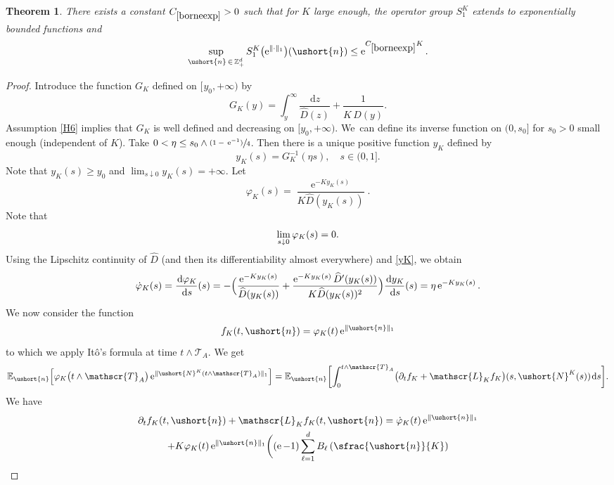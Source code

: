 \documentclass[JEP,XML,SOM,Unicode]{cedram}
\newcommand{\psfrac}[2]{\sfrac{(#1)}{#2}}
\let\mathcal\mathscr
\numberwithin{equation}{section}
\theoremstyle{plain}
\newtheorem{theorem}{Theorem}[section]
\theoremstyle{definition}
\newcommand{\cte}[1]{C_{\eqref{#1}}}
\newcommand{\E}{{\mathbb{E}}}
\newcommand{\zentiers}{{\mathbb{Z}}}
\newcommand{\sdomaine}{{\zentiers}_+^d}
\newcommand{\sK}{K}
\newcommand{\gen}{\mathscr{L}_{\sK}}
\newcommand{\vecn}{\ushort{n}}
\newcommand{\leproc}{\ushort{N}^{K}}
\newcommand{\sleproc}{\ushort{N}^{K}}
\newcommand{\e}{\operatorname{e}}
\newcommand{\dd}{\hspace{1pt}\mathrm{d}}
\begin{document}
\begin{theorem}\label{borneexp}
There exists a constant $\cte{borneexp}>0$ such that for $K$ large enough, the operator
group $S^{\sK}_{1}$ extends to exponentially bounded functions and
\[
\sup_{\vecn\, \in\, \sdomaine} S^{\sK}_{1}\bigl(\e^{\|\hspace{-0.1pt}\cdot\|_{1}}\bigr)(\vecn)\le
\e^{\cte{borneexp} K}.
\]
\end{theorem}
\begin{proof}
Introduce the function $G_{\sK}$ defined on $[\hspace{1pt}y_{0},+\infty)$ by
\[
G_{\!\sK}(y) = \int_{y}^{\infty}\frac{\dd z}{\widehat{D}(z)}+\frac{1}{K\,\widehat{D}(y)}.
\]
Assumption \eqref{H6} implies that $G_{\!\sK}$ is well defined and decreasing on $[y_{0},+\infty)$. We~can define its
inverse function on $(0,s_{0}]$ for $s_{0}>0$ small enough (independent of $K$).
Take $0<\eta \leq s_{0}\wedge \psfrac{1-\,\e^{-1}}{4}$. Then there is a unique positive function $y_{\sK}$ defined by
\begin{equation}
\label{yK}
y_{\sK}(s)=G_{\!\sK}^{-1}(\eta s),\quad s\in(0,1].
\end{equation}
Note that $y_{\sK}(s)\geq y_{0}$ and $\lim_{s\downarrow 0}y_{\sK}(s)=+\infty$.
Let
\[
\varphi_{\sK}(s)=\frac{\e^{-K y_{K}(s)}}{K \widehat{D}(y_{\sK}(s))}.
\]
Note that
\[
\lim_{s\hspace{.2pt}\downarrow\hspace{.2pt}0}\varphi_{\sK}(s)=0.
\]
Using the Lipschitz continuity of $\widehat{D}$ (and then its differentiability almost everywhere) and \eqref{yK}, we obtain
\[
\dot{\varphi}_{\sK}(s)=\frac{\dd\varphi_{\sK}}{\dd s}(s)=
-\Bigl(\frac{\e^{-K y_{K}(s)}}{\widehat{D}(y_{\sK}(s))}+
\frac{\e^{-K y_{K}(s)} \widehat{D}'(y_{\sK}(s))}{K \widehat{D}(y_{\sK}(s))^{2}}\Bigr)\frac{\dd y_{\sK}}{\dd s}(s)
= \eta \e^{-K y_{K}(s)}.
\]
We now consider the function
\[
f_{\sK}(t,\vecn)=\varphi_{\sK}(t)\e^{\|\vecn\|_{1}}
\]
to which we apply Itô's formula at time $t\wedge \mathcal{T}_A$. We get
\[
\E_{\vecn}\Bigl[\varphi_{\sK}\bigl(t\wedge \mathcal{T}_A\bigr)\e^{\|\sleproc(t\wedge \mathcal{T}_A)\|_{1}}\Bigr]=
\E_{\vecn} \biggl[\int_{0}^{t\wedge \mathcal{T}_A}\bigl(\partial_{t}f_{\sK}+\gen f_{\sK}\bigr)(s,\leproc(s))\dd s \biggr].
\]
We have
\begin{multline*}
\partial_{t}f_{\sK}(t,\vecn)+\gen f_{\sK}(t,\vecn)=
\dot\varphi_{\sK}(t)\e^{\|\vecn\|_{1}}\\
+K \varphi_{\sK}(t)\e^{\|\vecn\|_{1}}\biggl((\e-1)\sum_{\ell=1}^{d}B_{\ell}\left(\sfrac{\vecn}{K}\right)

\end{multline*}
\end{proof}
\end{document}
